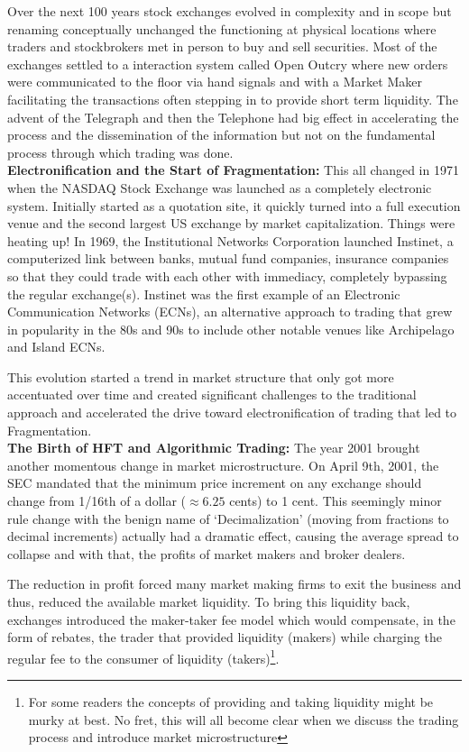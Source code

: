 Over the next 100 years stock exchanges evolved in complexity and in scope but renaming conceptually unchanged the functioning at physical locations where traders and stockbrokers met in person to buy and sell securities. Most of the exchanges settled to a interaction system called Open Outcry where new orders were communicated to the floor via hand signals and with a Market Maker facilitating the transactions often stepping in to provide short term liquidity. The advent of the Telegraph and then the Telephone had big effect in accelerating the process and the dissemination of the information but not on the fundamental process through which trading was done. \\


\noindent\textbf{Electronification and the Start of Fragmentation:} This all changed in 1971 when the NASDAQ Stock Exchange was launched as a completely electronic system. Initially started as a quotation site, it quickly turned into a full execution venue and the second largest US exchange by market capitalization. Things were heating up! In 1969, the Institutional Networks Corporation launched Instinet, a computerized link between banks, mutual fund companies, insurance companies so that they could trade with each other with immediacy, completely bypassing the regular exchange(s). Instinet was the first example of an Electronic Communication Networks (ECNs), an alternative approach to trading that grew in popularity in the 80s and 90s to include other notable venues like Archipelago and Island ECNs.


This evolution started a trend in market structure that only got more accentuated over time and created significant challenges to the traditional approach and accelerated the drive toward electronification of trading that led to Fragmentation. \\



\noindent\textbf{The Birth of HFT and Algorithmic Trading:} The year 2001 brought another momentous change in market microstructure. On April 9th, 2001, the SEC mandated that the minimum price increment on any exchange should change from 1/16th of a dollar ($\approx6.25$ cents) to 1 cent. This seemingly  minor rule change with the benign name of `Decimalization' (moving from fractions to decimal increments) actually had a dramatic effect, causing the average spread to collapse and with that, the profits of market makers and broker dealers.
 

The reduction in profit forced many market making firms to exit the business and thus, reduced the  available market liquidity. To bring this liquidity back, exchanges introduced the maker-taker fee model which would compensate, in the form of rebates, the trader that provided liquidity (makers) while charging the regular fee to the consumer of liquidity (takers)\footnote{For some readers the concepts of providing and taking liquidity might be murky at best. No fret, this will all become clear when we discuss the trading process and introduce market microstructure}.


